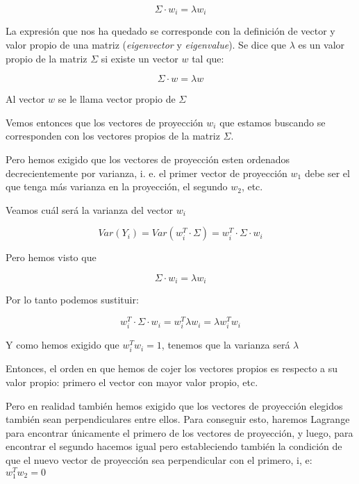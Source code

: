 \begin{equation*}
  \Sigma \cdot w_i = \lambda w_i
\end{equation*}

La expresión que nos ha quedado se corresponde con la definición de vector y valor propio de una matriz (\textit{eigenvector} y \textit{eigenvalue}). Se dice que $\lambda$ es un valor propio de la matriz $\Sigma$ si existe un vector $w$ tal que:

\begin{equation*}
  \Sigma \cdot w = \lambda w
\end{equation*}

Al vector $w$ se le llama vector propio de $\Sigma$

Vemos entonces que los vectores de proyección $w_i$ que estamos buscando se corresponden con los vectores propios de la matriz $\Sigma$.

Pero hemos exigido que los vectores de proyección esten ordenados decrecientemente por varianza, i. e. el primer vector de proyección $w_1$ debe ser el que tenga más varianza en la proyección, el segundo $w_2$, etc.

Veamos cuál será la varianza del vector $w_i$

\begin{equation*}
  Var(Y_i) = Var(w_i^T \cdot \Sigma) = w_i^T \cdot \Sigma \cdot w_i
\end{equation*}

Pero hemos visto que

\begin{equation*}
  \Sigma \cdot w_i = \lambda w_i
\end{equation*}

Por lo tanto podemos sustituir:

\begin{equation*}
  w_i^T \cdot \Sigma \cdot w_i = w_i^T \lambda w_i = \lambda w_i^Tw_i
\end{equation*}

Y como hemos exigido que $w_i^Tw_i = 1$, tenemos que la varianza será $\lambda$

Entonces, el orden en que hemos de cojer los vectores propios es respecto a su valor propio: primero el vector con mayor valor propio, etc.

Pero en realidad también hemos exigido que los vectores de proyección elegidos también sean perpendiculares entre ellos. Para conseguir esto, haremos Lagrange para encontrar únicamente el primero de los vectores de proyección, y luego, para encontrar el segundo hacemos igual pero estableciendo también la condición de que el nuevo vector de proyección sea perpendicular con el primero, i, e: $w_1^Tw_2 = 0$

